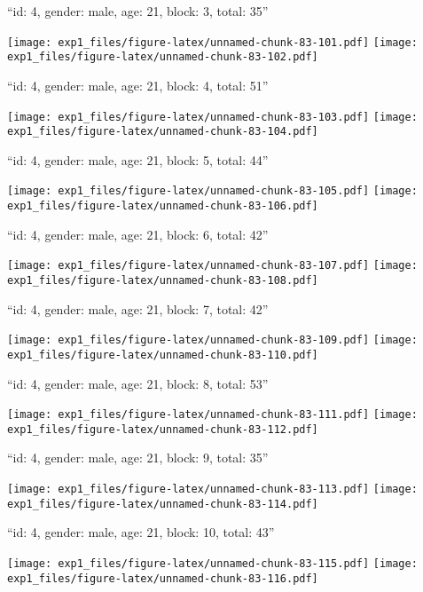 \documentclass[11pt,,]{article}
\begin{document}
\newpage
[1] 

``id: 4, gender: male, age: 21, block: 3, total: 35''

\texttt{[image: exp1\_files/figure-latex/unnamed-chunk-83-101.pdf]}
\texttt{[image: exp1\_files/figure-latex/unnamed-chunk-83-102.pdf]}

\newpage
[1] 

``id: 4, gender: male, age: 21, block: 4, total: 51''

\texttt{[image: exp1\_files/figure-latex/unnamed-chunk-83-103.pdf]}
\texttt{[image: exp1\_files/figure-latex/unnamed-chunk-83-104.pdf]}

\newpage
[1] 

``id: 4, gender: male, age: 21, block: 5, total: 44''

\texttt{[image: exp1\_files/figure-latex/unnamed-chunk-83-105.pdf]}
\texttt{[image: exp1\_files/figure-latex/unnamed-chunk-83-106.pdf]}

\newpage
[1] 

``id: 4, gender: male, age: 21, block: 6, total: 42''

\texttt{[image: exp1\_files/figure-latex/unnamed-chunk-83-107.pdf]}
\texttt{[image: exp1\_files/figure-latex/unnamed-chunk-83-108.pdf]}

\newpage
[1] 

``id: 4, gender: male, age: 21, block: 7, total: 42''

\texttt{[image: exp1\_files/figure-latex/unnamed-chunk-83-109.pdf]}
\texttt{[image: exp1\_files/figure-latex/unnamed-chunk-83-110.pdf]}

\newpage
[1] 

``id: 4, gender: male, age: 21, block: 8, total: 53''

\texttt{[image: exp1\_files/figure-latex/unnamed-chunk-83-111.pdf]}
\texttt{[image: exp1\_files/figure-latex/unnamed-chunk-83-112.pdf]}

\newpage
[1] 

``id: 4, gender: male, age: 21, block: 9, total: 35''

\texttt{[image: exp1\_files/figure-latex/unnamed-chunk-83-113.pdf]}
\texttt{[image: exp1\_files/figure-latex/unnamed-chunk-83-114.pdf]}

\newpage
[1] 

``id: 4, gender: male, age: 21, block: 10, total: 43''

\texttt{[image: exp1\_files/figure-latex/unnamed-chunk-83-115.pdf]}
\texttt{[image: exp1\_files/figure-latex/unnamed-chunk-83-116.pdf]}
\end{document}
